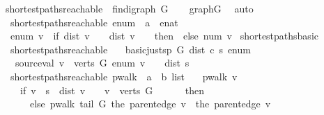 \begin{isabellebody}
\isanewline
\isanewline
{}\isamarkupfalse%
\ shortest{\isacharunderscore}paths{\isacharunderscore}reachable\ {\isasymsubseteq}\ fin{\isacharunderscore}digraph\ G\isanewline
%
\isadelimproof
\ \ %
\endisadelimproof
%
\isatagproof
{}\isamarkupfalse%
\ graphG\ \isamarkupfalse%
\ auto%
\endisatagproof
{\isafoldproof}%
%
\isadelimproof
\isanewline
%
\endisadelimproof
\isanewline
{}\isamarkupfalse%
\ {\isacharparenleft}\ shortest{\isacharunderscore}paths{\isacharunderscore}reachable{\isacharparenright}\ enum\ {\isacharcolon}{\isacharcolon}\ {\isachardoublequoteopen}{\isacharprime}a\ {\isasymRightarrow}\ enat{\isachardoublequoteclose}\ \isanewline
\ \ {\isachardoublequoteopen}enum\ v\ {\isacharequal}\ {\isacharparenleft}if\ {\isacharparenleft}dist\ v\ {\isacharequal}\ {\isasyminfinity}\ {\isasymor}\ dist\ v\ {\isacharequal}\ {\isacharminus}\ {\isasyminfinity}{\isacharparenright}\ then\ {\isasyminfinity}\ else\ num\ v{\isacharparenright}{\isachardoublequoteclose}\isanewline
\isanewline
{}\isamarkupfalse%
\ shortest{\isacharunderscore}paths{\isacharunderscore}basic\ {\isacharequal}\ \isanewline
\ \ shortest{\isacharunderscore}paths{\isacharunderscore}reachable\ {\isacharplus}\isanewline
\ \ basic{\isacharunderscore}just{\isacharunderscore}sp\ G\ dist\ c\ s\ enum\ {\isacharplus}\isanewline
\ \ \ source{\isacharunderscore}val{\isacharcolon}\ {\isachardoublequoteopen}{\isacharparenleft}{\isasymexists}v\ {\isasymin}\ verts\ G{\isachardot}\ enum\ v\ {\isasymnoteq}\ {\isasyminfinity}{\isacharparenright}\ {\isasymLongrightarrow}\ dist\ s\ {\isacharequal}\ {}{\isachardoublequoteclose}\isanewline
\isanewline
\isanewline
{}\isamarkupfalse%
\ {\isacharparenleft}\ shortest{\isacharunderscore}paths{\isacharunderscore}reachable{\isacharparenright}\ pwalk\ {\isacharcolon}{\isacharcolon}\ {\isachardoublequoteopen}{\isacharprime}a\ {\isasymRightarrow}\ {\isacharprime}b\ list{\isachardoublequoteclose}\ \isanewline
{}\isanewline
\ \ {\isachardoublequoteopen}pwalk\ v\ {\isacharequal}\ \isanewline
\ \ \ \ {\isacharparenleft}if\ {\isacharparenleft}v\ {\isacharequal}\ s\ {\isasymor}\ dist\ v\ {\isacharequal}\ {\isasyminfinity}\ {\isasymor}\ v\ {\isasymnotin}\ verts\ G{\isacharparenright}\isanewline
\ \ \ \ \ \ then\ {\isacharbrackleft}{\isacharbrackright}\ \isanewline
\ \ \ \ \ \ else\ pwalk\ {\isacharparenleft}tail\ G\ {\isacharparenleft}the\ {\isacharparenleft}parent{\isacharunderscore}edge\ v{\isacharparenright}{\isacharparenright}{\isacharparenright}\ {\isacharat}\ {\isacharbrackleft}the\ {\isacharparenleft}parent{\isacharunderscore}edge\ v{\isacharparenright}{\isacharbrackright}\isanewline

\end{isabellebody}
